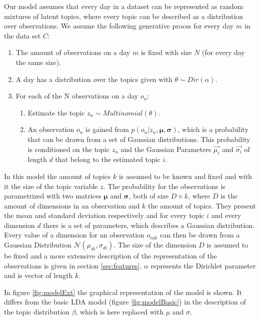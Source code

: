 \documentclass[a4paper,fleqn]{article}
\begin{document}
  Our model assumes that every day in a dataset can be represented as random mixtures of latent topics, where every topic can be described as a distribution over observations. We assume the following generative procss for every day $m$ in the data set $C$:
\begin{enumerate}
 \item The amount of observations on a day $m$ is fixed with size $N$ (for every day the same size).
 \item A day has a distribution over the topics given with $\theta \sim Dir(\alpha)$.
 \item For each of the N observations on a day $o_n$:
 
 \begin{enumerate}
  \item Estimate the topic $z_n \sim Multinomial(\theta)$.
  \item An observation $o_n$ is gained from $p(o_n |z_n,\boldsymbol\mu,\boldsymbol\sigma)$,  which is a probability that can be drawn from a set of Gaussian distributions. This probability is conditioned on the topic $z_n$ and the Gaussian Parameters $\vec{\mu_i}$ and $\vec{\sigma_i}$ of length $d$ that belong to the estimated topic $i$.
 \end{enumerate}

\end{enumerate}
  
In this model the amount of topics $k$ is assumed to be known and fixed and with it the size of the topic variable $z$.
The probability for the observations is parametrized with two matrices $\boldsymbol\mu$ and $\boldsymbol\sigma$, both of size $D\times k$, where $D$ is the amount of dimensions in an observation and $k$ the amount of topics. They present the mean and standard deviation respectively and for every topic $i$ and every dimension $d$ there is a set of parameters, which describes a Gaussian distribution. Every value of a dimension for an observation $o_{ndi}$ can then be drawn from a Gaussian Distribution $\mathcal{N}(\mu_{di},\sigma_{di})$.
The size of the dimension $D$ is assumed to be fixed and a more extensive description of the representation of the observations is given in section \ref{sec:features}. $\alpha$ represents the Dirichlet parameter and is vector of length $k$.

In figure \ref{fig:modelExt} the graphical representation of the model is shown. It differs from the basic LDA model (figure \ref{fig:modelBasic}) in the description of the topic distribution $\beta$, which is here replaced with $\mu$ and $\sigma$.
\end{document}
